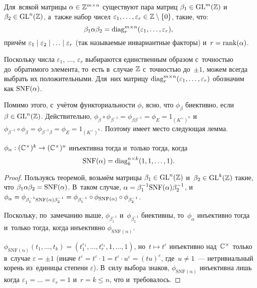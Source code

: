 \begin{theorem*}
  Для~всякой матрицы $\alpha \in \mathbb{Z}^{m \times n}$ существуют
  пара матриц $\beta_1 \in \mathrm{GL}^m(\mathbb{Z})$ и~$\beta_2 \in \mathrm{GL}^n(\mathbb{Z})$,
  а~также набор чисел $\varepsilon_1, \ldots, \varepsilon_r \in \mathbb{Z} \setminus \{0\}$,
  такие, что:
  \[
    \beta_1 \alpha \beta_2 = \mathrm{diag}^{m \times n}_r(\varepsilon_1, \ldots, \varepsilon_r),
  \]
  причём $\varepsilon_1 \mid \varepsilon_2 \mid \ldots \mid \varepsilon_r$ (так называемые инвариантные факторы) и~$r = \mathrm{rank}(\alpha)$.
\end{theorem*}

Поскольку числа $\varepsilon_1$, $\ldots$, $\varepsilon_r$ выбираются единственным образом с~точностью
до~обратимого элемента, то~есть в~случае $\mathbb{Z}$ с~точностью до~$\pm 1$, можем всегда выбрать их положительными.
Для~них матрицу $\mathrm{diag}^{m \times n}_r(\varepsilon_1, \ldots, \varepsilon_r)$ обозначим как $\mathrm{SNF}(\alpha)$.

Помимо этого, с~учётом функториальности $\phi$, ясно, что $\phi_\beta$ биективно, если $\beta \in \mathrm{GL}^n(\mathbb{Z})$.
Действительно, $\phi_\beta \circ \phi_{\beta^{-1}} = \phi_{\beta \beta^{-1}} = \phi_E = 1_{(K^\times)^n}$
и~$\phi_{\beta^{-1}} \circ \phi_\beta = \phi_{\beta^{-1} \beta} = \phi_E = 1_{(K^\times)^n}$.
Поэтому имеет место следующая лемма.

\begin{lemma}
\label{lemma:injectivityOutOfSNF}
  $\phi_\alpha : (\mathbb{C}^\times)^k \rightarrow (\mathbb{C}^\times)^n$ инъективна тогда и~только тогда, когда
  \[
    \mathrm{SNF}(\alpha) = \mathrm{diag}^{n \times k}_k(1, 1, \ldots, 1).
  \]
\end{lemma}

\begin{proof}
  Пользуясь теоремой, возьмём матрицы $\beta_1 \in \mathrm{GL}^n(\mathbb{Z})$ и~$\beta_2 \in \mathrm{GL}^k(\mathbb{Z})$
  такие, что $\beta_1 \alpha \beta_2 = \mathrm{SNF}(\alpha)$.
  В~таком случае, $\alpha = \beta_1^{-1} \mathrm{SNF}(\alpha) \beta_2^{-1}$, и~$\phi_\alpha = \phi_{\beta_1^{-1} \mathrm{SNF}(\alpha) \beta_2^{-1}}
                                                                                    = \phi_{\beta_1^{-1}} \circ \phi_{\mathrm{SNF}(\alpha)} \circ \phi_{\beta_2^{-1}}$.

  Поскольку, по~замечанию выше, $\phi_{\beta_1^{-1}}$ и~$\phi_{\beta_2^{-1}}$ биективны, то~$\phi_\alpha$
  инъективно тогда и~только тогда, когда инъективно $\phi_{\mathrm{SNF(\alpha)}}$.

  $\phi_{\mathrm{SNF(\alpha)}}(t_1, \ldots, t_k) = (t_1^{\varepsilon_1}, \ldots, t_r^{\varepsilon_r}, 1, \ldots, 1)$,
  но~$t \mapsto t^\varepsilon$ инъективно над~$\mathbb{C}^\times$ только в~случае $\varepsilon = \pm 1$
  (иначе $t^\varepsilon = t^\varepsilon \cdot 1 = t^\varepsilon \cdot u^\varepsilon = (tu)^\varepsilon$,
  где~$u \neq 1$~— нетривиальный корень из~единицы степени $\varepsilon$).
  В~силу выбора знаков, $\phi_{\mathrm{SNF(\alpha)}}$ инъективна лишь когда $\varepsilon_1 = \ldots = \varepsilon_r = 1$
  и~$r = k \leq n$, что и~требовалось.
\end{proof}

